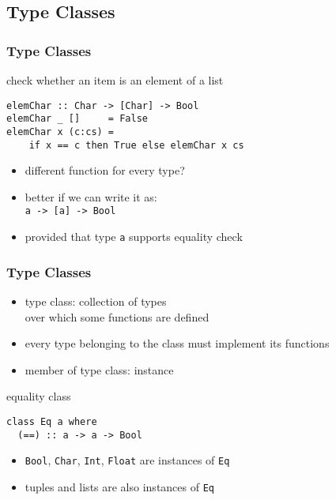 \documentclass[dvipsnames]{beamer}
\theoremstyle{plain}
\begin{document}
\subsection{Type Classes}

\begin{frame}[fragile]
  \frametitle{Type Classes}

  \begin{exampleblock}{check whether an item is an element of a list}
    \begin{lstlisting}
elemChar :: Char -> [Char] -> Bool
elemChar _ []     = False
elemChar x (c:cs) =
    if x == c then True else elemChar x cs
    \end{lstlisting}
  \end{exampleblock}

  \pause
  \begin{itemize}
    \item different function for every type?
    \item better if we can write it as:\\
      \lstinline|a -> [a] -> Bool|
    \item provided that type \lstinline|a| supports equality check
  \end{itemize}
\end{frame}

\begin{frame}[fragile]
  \frametitle{Type Classes}

  \begin{itemize}
    \item \alert{type class}: collection of types\\
      over which some functions are defined
    \item every type belonging to the class must implement its functions
    \item member of type class: \alert{instance}
  \end{itemize}

  \pause
  \begin{exampleblock}{equality class}
    \begin{lstlisting}
class Eq a where
  (==) :: a -> a -> Bool
    \end{lstlisting}
    \begin{itemize}
      \item \lstinline|Bool|, \lstinline|Char|, \lstinline|Int|, \lstinline|Float|
        are instances of \lstinline|Eq|
      \item tuples and lists are also instances of \lstinline|Eq|
    \end{itemize}
  \end{exampleblock}
\end{frame}
\end{document}
